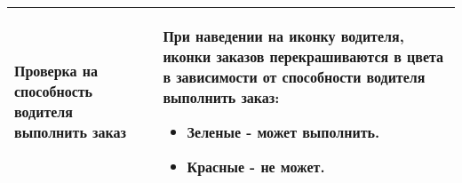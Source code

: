 \begin{longtable}{|p{4cm}|p{9cm}|}
			    \hline	Проверка на способность водителя выполнить заказ & При наведении на иконку водителя, иконки заказов перекрашиваются в цвета в зависимости от способности водителя выполнить заказ:
																			\begin{itemize} 
																				\item Зеленые - может выполнить.
																		   		\item Красные - не может.
																			\end{itemize}\\ [2mm]

				\hline 
			\end{longtable}